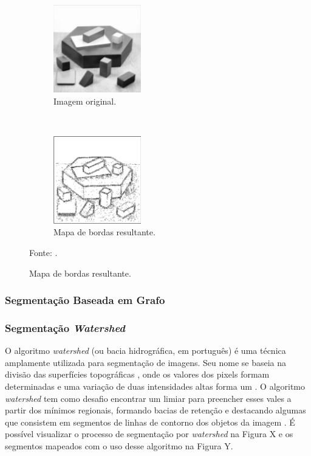 \begin{figure}[H]
   \caption{Segmentação com operador Laplaciano.}
   \centering
   \label{segment:fig:8}
    \begin{subfigure}[t]{0.45\textwidth}
        \centering
        \includegraphics[height=1.5in]{recursos/imagens/image_seg/ol1.png}
        \caption{Imagem original.}
        \label{segment:fig:8.1}
    \end{subfigure}%
    ~ 
    \begin{subfigure}[t]{0.45\textwidth}
        \centering
        \includegraphics[height=1.5in]{recursos/imagens/image_seg/lp2.png}
        \caption{Mapa de bordas resultante.}
        \label{segment:fig:8.2}
    \end{subfigure}%

    Fonte: \cite{pedrini2008analise}.
\end{figure}

\subsubsection{Segmentação Baseada em Grafo}
\label{segment:graph}

\subsubsection{Segmentação \textit{Watershed}}
\label{segment:watershed}

O algoritmo \textit{watershed} (ou bacia hidrográfica, em português) é uma técnica amplamente utilizada para segmentação de imagens. Seu nome se baseia na divisão das superfícies topográficas \citep{pedrini2008analise}, onde os valores dos pixels formam determinadas  e uma variação de duas intensidades altas forma um . O algoritmo \textit{watershed} tem como desafio encontrar um limiar para preencher esses vales a partir dos mínimos regionais, formando bacias de retenção e destacando algumas  que consistem em segmentos de linhas de contorno dos objetos da imagem \citep{pedrini2008analise, SealWatershed:Approach}. É possível visualizar o processo de segmentação por \textit{watershed} na Figura X e os segmentos mapeados com o uso desse algoritmo na Figura Y. 

